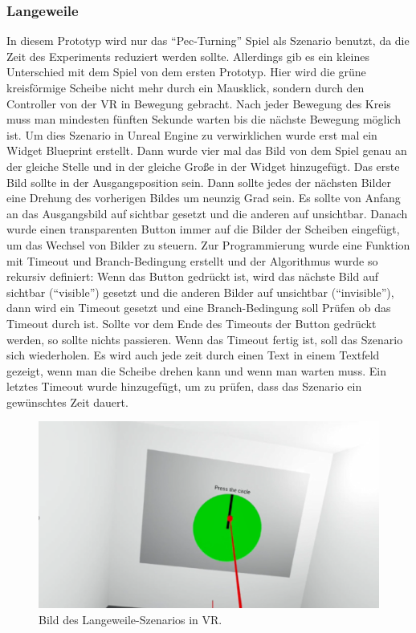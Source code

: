 \subsubsection{Langeweile} \label{langeweile-4}


In diesem Prototyp wird nur das ``Pec-Turning'' Spiel als Szenario benutzt, da die Zeit des Experiments reduziert werden sollte. Allerdings gib es ein kleines Unterschied mit dem Spiel von dem ersten Prototyp. 
Hier wird die grüne kreisförmige Scheibe nicht mehr durch ein Mausklick, sondern durch den Controller von der VR  in Bewegung gebracht. Nach jeder Bewegung des Kreis muss man mindesten fünften Sekunde warten bis die nächste Bewegung möglich ist.
Um dies Szenario in Unreal Engine zu verwirklichen wurde erst mal ein Widget Blueprint erstellt. 
Dann wurde vier mal das Bild von dem Spiel genau an der gleiche Stelle und in der gleiche Große in der Widget hinzugefügt. 
Das erste Bild sollte in der Ausgangsposition sein. 
Dann sollte jedes der nächsten Bilder eine Drehung des vorherigen Bildes um neunzig Grad sein. 
Es sollte von Anfang an das Ausgangsbild auf sichtbar gesetzt und die anderen auf unsichtbar. 
Danach wurde einen transparenten Button immer auf die Bilder der Scheiben eingefügt, um das Wechsel von Bilder zu steuern. 
Zur Programmierung wurde eine Funktion mit Timeout und Branch-Bedingung erstellt und der Algorithmus wurde so rekursiv definiert: 
Wenn das Button gedrückt ist, wird das nächste Bild auf sichtbar (``visible'') gesetzt und die anderen Bilder auf unsichtbar (``invisible''), dann wird ein Timeout gesetzt und eine Branch-Bedingung soll Prüfen ob das Timeout durch ist. Sollte vor dem Ende des Timeouts der Button gedrückt werden, so sollte nichts passieren. 
Wenn das Timeout fertig ist, soll das Szenario sich wiederholen. 
Es wird auch jede zeit durch einen Text in einem Textfeld gezeigt, wenn man die Scheibe drehen kann und wenn man warten muss. 
Ein letztes Timeout wurde hinzugefügt, um zu prüfen, dass das Szenario ein gewünschtes Zeit dauert.


\begin{figure}[H] \centering
\includegraphics[width=\textwidth]{Images/Boredom.png} 
\caption{ Bild des Langeweile-Szenarios in VR. }
\label{fig:boredom4} 
\end{figure}

